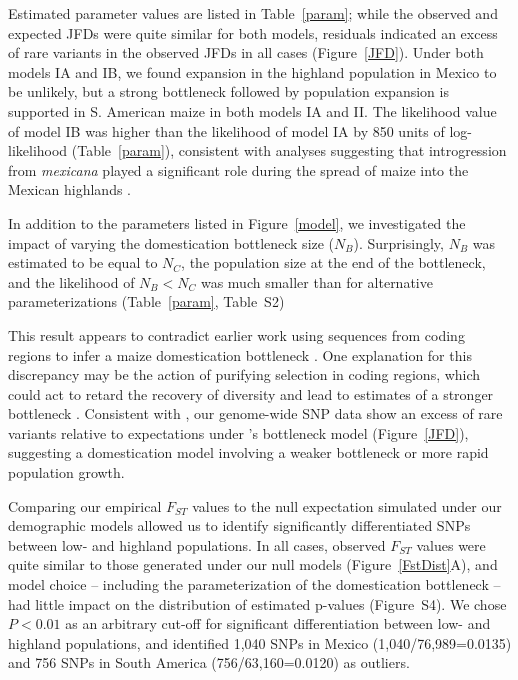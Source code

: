 Estimated parameter values are listed in Table~\ref{param}; 
while the observed and expected JFDs were quite similar for both models,  
residuals indicated an excess of rare variants in the observed JFDs in all cases (Figure~\ref{JFD}). 
Under both models IA and IB,  we found expansion in the highland population in Mexico to be unlikely, but a strong bottleneck followed by population expansion is supported in S. American maize in both models IA and II.  
The likelihood value of model IB was higher than the likelihood of model IA by 850 units of log-likelihood (Table~\ref{param}), 
consistent with analyses suggesting that introgression from \textit{mexicana} played a significant role during the spread of maize into the Mexican highlands \citep{Profford_2013}. 

In addition to the parameters listed in Figure~\ref{model}, we investigated the impact of varying the domestication bottleneck size ($N_B$).  
Surprisingly, $N_B$ was estimated to be equal to $N_C$, the population size at the end of the bottleneck, and the likelihood of $N_B<N_C$ was much smaller than for alternative parameterizations (Table~\ref{param}, Table~S2) 

This result appears to contradict earlier work using sequences from coding regions to infer a maize domestication bottleneck \cite[]{Eyre-Walker_1998_9539756,Tenaillon_2004_15014173,Wright_2005_15919994}.  One explanation for this discrepancy may be the action of purifying selection in coding regions, which could act to retard the recovery of diversity and lead to estimates of a stronger bottleneck \cite{Hufford_2012_22660546}.  Consistent with \citet{Hufford_2012_22660546}, our genome-wide SNP data show an excess of rare variants relative to expectations under \cite{Wright_2005_15919994}'s bottleneck model (Figure~\ref{JFD}), suggesting a domestication model involving a weaker bottleneck or more rapid population growth.

Comparing our empirical $F_{ST}$ values to the null expectation simulated under our demographic models allowed us to identify significantly differentiated SNPs between low- and highland populations. In all cases, observed $F_{ST}$ values were quite similar to those generated under our null models (Figure~\ref{FstDist}A), and model choice -- including the parameterization of the domestication bottleneck -- had little impact on the distribution of estimated p-values (Figure~S4). We chose $P<0.01$ as an arbitrary cut-off for significant differentiation between low- and highland populations, and identified 1,040 SNPs in Mexico (1,040/76,989=0.0135) and 756 SNPs in South America (756/63,160=0.0120) as outliers.

